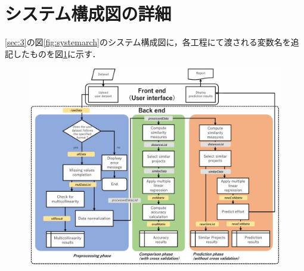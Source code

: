 \section{システム構成図の詳細}
\ref{sec:3}の図\ref{fig:systemarch}のシステム構成図に，各工程にて渡される変数名を追記したものを図\ref{fig:systemarch_detail}に示す．

\begin{figure}[ht]
  \centering
  \includegraphics[width=120mm]{figure/fig/SystemArch_detail_20241123.jpg}
  \captionsetup{labelformat=empty} %
  \caption{}
  \label{fig:systemarch_detail}
\end{figure}
%
